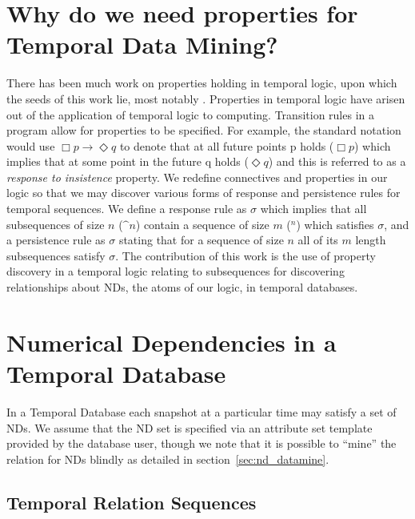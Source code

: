 \section{Why do we need properties for Temporal Data Mining?}\label{sec:tl_why}

There has been much work on properties holding in temporal logic, upon
which the seeds of this work lie, most notably \cite{mp92}. Properties
in temporal logic have arisen out of the application of temporal logic
to computing. Transition rules in a program allow for properties to be
specified. For example, the standard notation would use $\Box p \to
\Diamond q$ to denote that at all future points p holds ($\Box p$)
which implies
that at some point in the future q holds ($\Diamond q$) and this is
referred to as a
{\em response to insistence} property. We redefine connectives and
properties in
our logic so that we may discover various forms of response and
persistence rules for temporal sequences. We define a response rule as
 $\sigma$ which implies that all subsequences
of size $n$ ($\bm^n$) contain a sequence of size $m$ (\diam$^n$) which
satisfies $\sigma$, and a persistence rule as  $\sigma$  
stating that for a sequence of size $n$ all of its $m$ length subsequences
satisfy $\sigma$.
The contribution of this work is the use of property discovery in a
temporal logic relating to subsequences for discovering relationships
about NDs, the atoms of our logic, in temporal databases.
	
\section{Numerical Dependencies in a Temporal Database}\label{sec:tl_nd}

In a Temporal Database each snapshot at a particular time may satisfy
a set of NDs. We assume that the ND set is specified via an attribute
set template provided by the database user, though we note that it is
possible to ``mine'' the relation for NDs blindly as detailed in section~\ref{sec:nd_datamine}.

\subsection{Temporal Relation Sequences}\label{sec:tl_relations}


